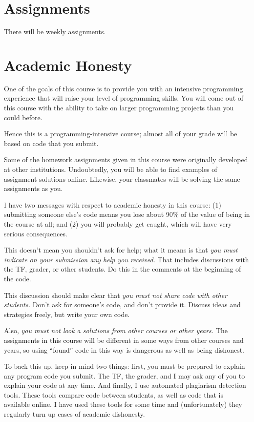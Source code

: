 \documentclass[11pt]{article}
\begin{document}
\section*{Assignments}

There will be weekly assignments.

\section*{Academic Honesty}
One of the goals of this course is to provide you with an intensive
programming experience that will raise your level of programming
skills.  You will come out of this course with the ability to take on
larger programming projects than you could before.  

Hence this is a programming-intensive course;  almost all of your grade will
be based on code that you submit.   

Some of the homework assignments given in this course were originally developed
at other institutions.  Undoubtedly, you will be able to find examples of
assignment solutions online.   Likewise, your classmates will be solving
the same assignments as you.

I have two messages with respect to academic honesty in this course: (1)
submitting someone else's code means you lose about 90\% of the value of
being in the course at all;  and (2) you will probably get caught, which
will have very serious consequences.

This doesn't mean you shouldn't ask for help;  what it means is that
\emph{you must indicate on your submission any help you received.}  That
includes discussions with the TF, grader, or other students.  Do this in
the comments at the beginning of the code.

This discussion should make clear that \emph{you must not share code
  with other students.}  Don't ask for someone's code, and don't provide
  it.  Discuss ideas and strategies freely, but write your own code.

Also, \emph{you must not look a solutions from other courses or other
  years.}  The assignments in this course will be different in some ways
  from other courses and years, so using ``found'' code in this way is
  dangerous as well as being dishonest.

To back this up, keep in mind two things:  first, you must be prepared
to explain any program code you submit.   The TF, the grader, and I may
ask any of you to explain your code at any time.   And finally, I use
automated plagiarism detection tools.  These tools compare code between
students, as well as code that is available online.  I have used these
tools for some time and (unfortunately) they regularly turn up cases of
academic dishonesty.
\end{document}
